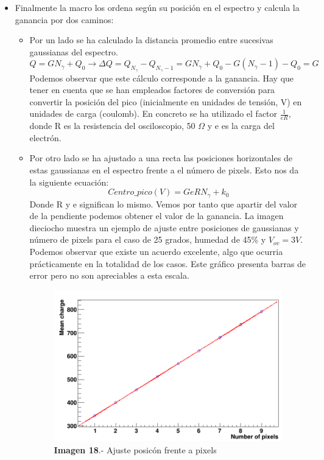 \begin{itemize}
\item {} Finalmente la macro los ordena según su posición en el espectro y calcula la ganancia por dos caminos:
	\begin{itemize}

	\item {} Por un lado se ha calculado la distancia promedio entre sucesivas gaussianas del espectro. 
	$$Q = G N_\gamma + Q_0 \longrightarrow \Delta Q= Q_{N_\gamma} - Q_{N_\gamma -1}=G N_\gamma+ Q_0 - G(N_		\gamma -1) - Q_0 = G$$
	Podemos observar que este cálculo corresponde a la ganancia. Hay que tener en cuenta que se han 			empleados factores de conversión para convertir la posición del pico (inicialmente en unidades de			tensión, V) en unidades de carga (coulomb). En concreto se ha utilizado el factor $\frac{1}{eR}$, 			donde R es la resistencia del osciloscopio, 50 $\Omega$ y e es la carga del electrón.
	
	\item {} Por otro lado se ha ajustado a una recta las posiciones horizontales de estas gaussianas en el 	espectro frente a el número de pixels. Esto nos da la siguiente ecuación:
	$$Centro\_pico(V) = GeRN_\gamma + k_0$$	
	Donde R y e significan lo mismo. Vemos por tanto que apartir del valor de la pendiente podemos obtener 		el valor de la ganancia. La imagen dieciocho muestra un ejemplo de ajuste entre posiciones de 				gaussianas y número de pixels para el caso de 25 grados, humedad de 45\% y $V_{ov}=3V$. Podemos 			observar que existe	un acuerdo excelente, algo que ocurria prácticamente en la totalidad de los casos. 		Este gráfico presenta barras de error pero no son apreciables a esta escala.
		
	\begin{figure}[hbtp]
		\centering
		\includegraphics[scale=0.2]{FitPosicionPixels.png}
		\caption{\textbf{Imagen 18}.- Ajuste posicón frente a pixels}
		\end{figure}
			

\end{itemize}
\end{itemize}

